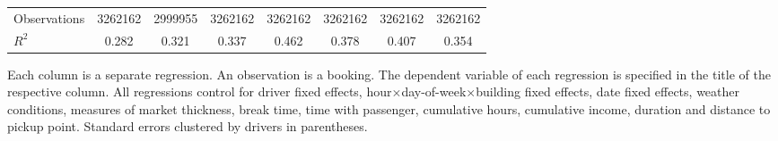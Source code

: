 \documentclass[reviewmode,AEJ]{AEA}
\begin{document}
\begin{table}[]
{\begin{tabularx}{\textwidth}{p{3.8cm}*{7}{S[table-format = 0.4, table-space-text-pre={**}, table-space-text-post={-**}]}}
        Observations        &\num{3262162}         &\num{2999955}         &\num{3262162}         &\num{3262162}         &\num{3262162}         &\num{3262162}         &\num{3262162}         \\
        \(R^2\)             & \num{0.282}         & \num{0.321}         & \num{0.337}         & \num{0.462}         & \num{0.378}         & \num{0.407}         & \num{0.354}         \\
        \bottomrule
		\end{tabularx}
		}
		\begin{tablenotes}
	    	\small
			Each column is a separate regression. An observation is a booking. The dependent variable of each regression is specified in the title of the respective column. All regressions control for driver fixed effects, hour\(\times\)day-of-week\(\times\)building fixed effects, date fixed effects, weather conditions, measures of market thickness, break time, time with passenger, cumulative hours, cumulative income, duration and distance to pickup point. Standard errors clustered by drivers in parentheses.%
		\end{tablenotes}

    \hfill



\end{table}
\end{document}
